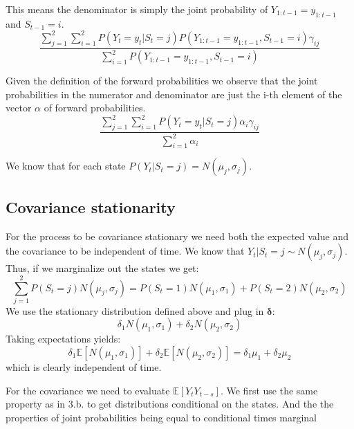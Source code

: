 \documentclass[11pt]{article}
\begin{document}
This means the denominator is simply the joint probability of $Y_{1:t-1}=y_{1:t-1}$ and $S_{t-1} = i$. 
\begin{equation}
  \label{eq:8}
   \frac{\sum_{j=1}^2 \sum_{i=1}^2 P(Y_t=y_t|S_t=j) P(Y_{1:t-1}=y_{1:t-1},S_{t-1}=i) \gamma_{ij}}{\sum_{i=1}^2 P(Y_{1:t-1}=y_{1:t-1}, S_{t-1} = i)}
 \end{equation}

 Given the definition of the forward probabilities we observe that the joint probabilities in the numerator and denominator are just the i-th element of the vector $\alpha$ of forward probabilities.
\begin{equation}
  \label{eq:9}
   \frac{\sum_{j=1}^2 \sum_{i=1}^2 P(Y_t=y_t|S_t=j) \alpha_i \gamma_{ij}}{\sum_{i=1}^2 \alpha_i}
 \end{equation}

We know that for each state $P(Y_t|S_t=j) = N(\mu_j,\sigma_j)$. 

\subsection{Covariance stationarity}
\label{sec:covar-stat}

For the process to be covariance stationary we need both the expected value and the covariance to be independent of time.
We know that $Y_t|S_t=j \sim N(\mu_j, \sigma_j)$. Thus, if we marginalize out the states we get:
\begin{equation}
  \label{eq:16}
\sum_{j=1}^2 P(S_t=j) N(\mu_j, \sigma_j) = P(S_t=1) N(\mu_1, \sigma_1) + P(S_t=2) N(\mu_2, \sigma_2)
\end{equation}
We use the stationary distribution defined above and plug in $\mathbf{\delta}$:
\begin{equation}
  \label{eq:17}
  \delta_1 N(\mu_1, \sigma_1) + \delta_2 N(\mu_2, \sigma_2)
\end{equation}
Taking expectations yields:
\begin{equation}
  \label{eq:18}
  \delta_1 \mathbb{E}[N(\mu_1, \sigma_1)] + \delta_2 \mathbb{E}[N(\mu_2, \sigma_2)] = \delta_1 \mu_1 + \delta_2 \mu_2
\end{equation}
which is clearly independent of time.

For the covariance we need to evaluate $\mathbb{E}[Y_tY_{t-s}]$.
We first use the same property as in 3.b. to get distributions conditional on the states. And the the properties of joint probabilities being equal to conditional times marginal
\end{document}
